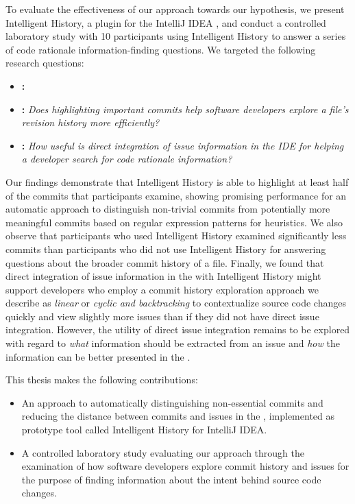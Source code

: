To evaluate the effectiveness of our approach towards our hypothesis, 
we present Intelligent History, a plugin for the IntelliJ IDEA ,
and conduct a controlled laboratory study with 10 participants using Intelligent History to answer a series of code rationale information-finding questions.
We targeted the following research questions:

\begin{itemize}[leftmargin=*]
    \item[] \textbf{:} \textit{}
    \item[] \textbf{:} \textit{Does highlighting important commits help software developers explore a file’s revision history more efficiently?}
    \item[] \textbf{:} \textit{How useful is direct integration of issue information in the IDE for helping a developer search for code rationale information?}
\end{itemize}

Our findings demonstrate that Intelligent History is able to highlight at least half of
the commits that participants examine, showing promising performance for
an automatic approach to distinguish non-trivial commits from potentially
more meaningful commits based on regular expression patterns for heuristics.
We also observe that participants who used Intelligent History examined significantly
less commits than participants who did not use Intelligent History for answering
questions about the broader commit history of a file.
Finally, we found that direct integration of issue information in the 
with Intelligent History might support developers who employ a commit history exploration approach
we describe as \textit{linear} or \textit{cyclic and backtracking} to contextualize
source code changes quickly and view slightly more issues than if they did not have
direct issue integration. 
However, the utility of direct issue integration remains to be explored with
regard to \emph{what} information should be extracted from an issue
and \emph{how} the information can be better presented in the .

This thesis makes the following contributions:
\begin{itemize}
	\item An approach to automatically distinguishing non-essential commits and reducing the distance between commits and issues in the , 
		implemented as prototype tool called Intelligent History for IntelliJ IDEA.
	\item A controlled laboratory study evaluating our approach through the examination of how software developers explore commit history and issues
		for the purpose of finding information about the intent behind source code changes.
\end{itemize}

